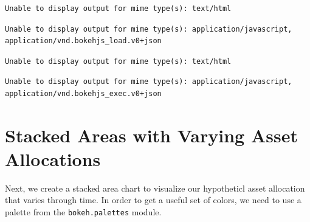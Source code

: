 \documentclass[
  letterpaper,
  DIV=11,
  numbers=noendperiod]{scrreprt}
\begin{document}
\begin{verbatim}
Unable to display output for mime type(s): text/html
\end{verbatim}

\begin{verbatim}
Unable to display output for mime type(s): application/javascript, application/vnd.bokehjs_load.v0+json
\end{verbatim}

\begin{verbatim}
Unable to display output for mime type(s): text/html
\end{verbatim}

\begin{verbatim}
Unable to display output for mime type(s): application/javascript, application/vnd.bokehjs_exec.v0+json
\end{verbatim}

\hypertarget{stacked-areas-with-varying-asset-allocations}{%
\section{Stacked Areas with Varying Asset
Allocations}\label{stacked-areas-with-varying-asset-allocations}}

Next, we create a stacked area chart to visualize our hypotheticl asset
allocation that varies through time. In order to get a useful set of
colors, we need to use a palette from the \texttt{bokeh.palettes}
module.
\end{document}
